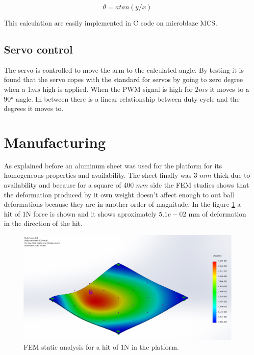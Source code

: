 		\begin{equation}
			\theta = atan(y/x)
			\label{eq:angle}
		\end{equation}

		This calculation are easily implemented in C code on microblaze MCS.

		\subsection{Servo control}
		The servo is controlled to move the arm to the calculated angle. By testing it is found that the servo copes with the standard for servos by going to zero degree when a $1\si{ms}$ high is applied. When the PWM signal is high for $2\si{ms}$ it moves to a $90\si{\degree}$ angle. In between there is a linear relationship between duty cycle and the degrees it moves to.



	\section{Manufacturing} %
	\label{sec:mechanics_manufacturing}
		As explained before an aluminum sheet was used for the platform for its homogeneous properties and availability. 
		The sheet finally was 3 $mm$ thick due to availability and because for a square of 400 $mm$ side the FEM studies shows that the deformation produced by it own weight doesn't affect enough to out ball deformations because they are in another order of magnitude. 
		In the figure \ref{fig:FEM} a hit of 1N force is shown and it shows aproximately $5.1e-02$ mm of deformation in the direction of the hit.

		\begin{figure}[!ht]
			\begin{center}
				\includegraphics[width=.8\textwidth]{figures/FEM}
			\end{center}
			\caption{FEM static analysis for a hit of 1N in the platform.}
			\label{fig:FEM}
		\end{figure}

